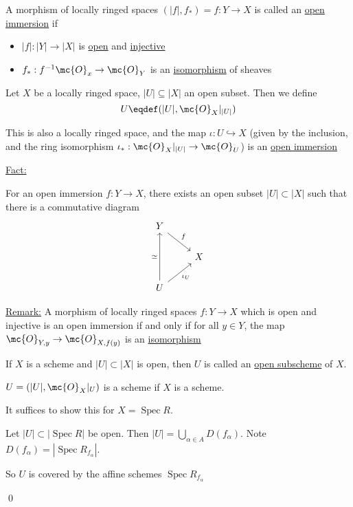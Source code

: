 \documentclass[x11names,reqno,14pt]{extarticle}
\renewcommand{\O}{\mc{O}}
\DeclareMathOperator{\Spec}{Spec}
\newcommand{\into}{\hookrightarrow}
\begin{document}

A morphism of locally ringed spaces $(|f|, f_*) = f:Y\to X$ is called an \underline{open immersion} if 
\begin{itemize}

\item $|f|:|Y|\to|X|$ is \underline{open} and \underline{injective}

\item $f_*:f^{-1}\O_x \to \mc{O}_Y$ is an \underline{isomorphism} of sheaves

\end{itemize}


Let $X$ be a locally ringed space, $|U|\subseteq |X|$ an open subset. Then we define 
\[
U \eqdef (|U|, \O_X|_{|U|})
\]

This is also a locally ringed space, and the map $\iota:U\into X$ (given by the inclusion, and the ring isomorphism $\iota_*:\O_X|_{|U|} \to \O_U$) is an \underline{open immersion}

\underline{Fact:}

For an open immersion $f:Y\to X$, there exists an open subset $|U|\subset |X|$ such that there is a commutative diagram
\[
\begin{tikzcd}
Y \ar[dr, "f"] & \\
& X \\
U \ar[uu, "\simeq"] \ar[ur, "\iota_U"'] &
\end{tikzcd}
\]

\underline{Remark:} A morphism of locally ringed spaces $f:Y\to X$ which is open and injective is an open immersion if and only if for all $y \in Y$, the map $\O_{Y,y} \to \O_{X,f(y)}$ is an \underline{isomorphism}


If $X$ is a scheme and $|U|\subset |X|$ is open, then $U$ is called an \underline{open subscheme} of $X$. 

\lem

$U = (|U|, \O_X|_U)$ is a scheme if $X$ is a scheme. 

\proof

It suffices to show this for $X = \Spec R$. 

Let $|U| \subset |\Spec R|$ be open. Then $|U| = \bigcup_{\alpha\in A} D(f_\alpha)$. Note $D(f_\alpha) = |\Spec R_{f_\alpha}|$.

So $U$ is covered by the affine schemes $\Spec R_{f_\alpha}$

\qed
\end{document}
